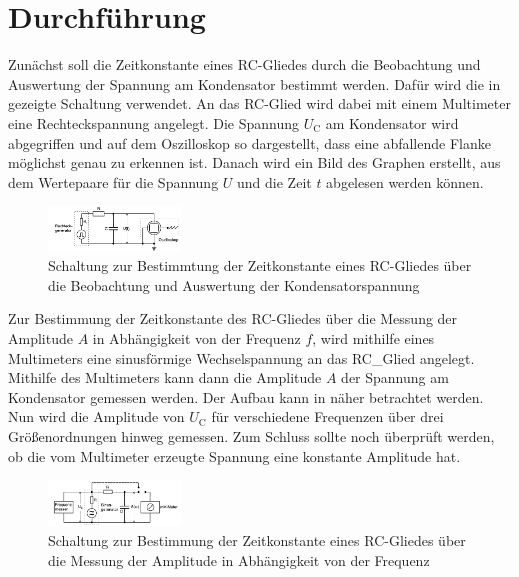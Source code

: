 \section{Durchführung}
\label{sec:Durchführung}
Zunächst soll die Zeitkonstante eines RC-Gliedes durch die Beobachtung und Auswertung
der Spannung am Kondensator bestimmt werden. Dafür wird die in 
gezeigte Schaltung verwendet. An das RC-Glied wird dabei mit einem Multimeter eine
Rechteckspannung angelegt. Die Spannung $U_{\text{C}}$ am Kondensator wird abgegriffen und auf dem
Oszilloskop so dargestellt, dass eine abfallende Flanke möglichst genau zu erkennen ist.
Danach wird ein Bild des Graphen erstellt, aus dem Wertepaare für die Spannung $U$
und die Zeit $t$ abgelesen werden können.

\begin{figure}
  \centering
  \includegraphics[width=100pt]{data/4a_schaltung.png}
  \caption{Schaltung zur Bestimmtung der Zeitkonstante eines RC-Gliedes über die Beobachtung
  und Auswertung der Kondensatorspannung \cite{Versuchsanleitung}}
  \label{fig:Schaltung_4a}
\end{figure}

Zur Bestimmung der Zeitkonstante des RC-Gliedes über die Messung der Amplitude $A$ in
Abhängigkeit von der Frequenz $f$, wird mithilfe eines Multimeters eine sinusförmige
Wechselspannung an das RC_Glied angelegt. Mithilfe des Multimeters kann dann die Amplitude
$A$ der Spannung am Kondensator gemessen werden. Der Aufbau kann in 
näher betrachtet werden. Nun wird die Amplitude von $U_{\text{C}}$ für
verschiedene Frequenzen über drei Größenordnungen hinweg gemessen. Zum Schluss sollte
noch überprüft werden, ob die vom Multimeter erzeugte Spannung eine konstante Amplitude hat.

\begin{figure}
  \centering
  \includegraphics[width=100pt]{data/4b_schaltung.png}
  \caption{Schaltung zur Bestimmung der Zeitkonstante eines RC-Gliedes über die Messung
  der Amplitude in Abhängigkeit von der Frequenz \cite{Versuchsanleitung}}
  \label{fig:Schaltung_4b}
\end{figure}

